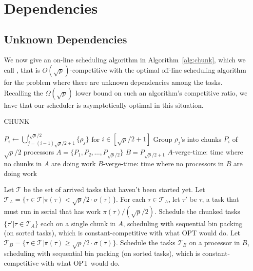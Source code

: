 \section{Dependencies}
\label{sec:dependencies}

\subsection{Unknown Dependencies}
We now give an on-line scheduling algorithm in
Algorithm~\ref{alg:chunk}, which we call , that is
$O(\sqrt{p})$-competitive with the optimal off-line scheduling
algorithm for the problem where there are unknown dependencies
among the tasks.
Recalling the $\Omega(\sqrt{p})$ lower bound on such an
algorithm's competitive ratio, we have that our scheduler is
asymptotically optimal in this situation.

\begin{algorithm}
  \caption{CHUNK}
  \label{alg:chunk}
  \begin{algorithmic}
    \State $P_i \gets \bigcup_{j=(i-1)\sqrt{p}/2+1}^{i\sqrt{p}/2} \{\rho_j\}$ for $i \in [\sqrt{p}/2+1]$
    \State
    \Comment Group $\rho_j$'s into chunks $P_i$ of $\sqrt{p}/2$ processors
    \State $A = \{P_1,P_2, \ldots, P_{\sqrt{p}/2} \} $
    \State $B = P_{\sqrt{p}/2 + 1}$
    \State $A$-verge-time: time where no chunks in $A$ are doing work
    \State $B$-verge-time: time where no processors in $B$ are doing work

    \State Let $\mathcal{T}$ be the set of arrived tasks that haven't been started yet.
    \State Let $\mathcal{T}_A = \{ \tau \in \mathcal{T} | \pi(\tau) < \sqrt{p}/2 \cdot \sigma(\tau) \}.$
      \State For each $\tau \in \mathcal{T}_A$, let $\tau'$ be
       $\tau$, a task that must run in serial that
      has work $\pi(\tau)/(\sqrt{p}/2)$.
      \State Schedule the chunked tasks $\{\tau' | \tau \in
      \mathcal{T}_A\}$ each on a single chunk in $A$, scheduling with
      sequential bin packing (on sorted tasks), which is
      constant-competitive with what OPT would do.
    \EndIf
      \State Let $\mathcal{T}_B = \{ \tau\in \mathcal{T}  | \pi(\tau) \ge \sqrt{p}/2 \cdot \sigma(\tau) \}.$
      \State Schedule the tasks $\mathcal{T}_B$ on a processor in
      $B$, scheduling with sequential bin packing (on sorted
      tasks), which is constant-competitive with what OPT would do.
    \EndIf
  \end{algorithmic}
\end{algorithm}

